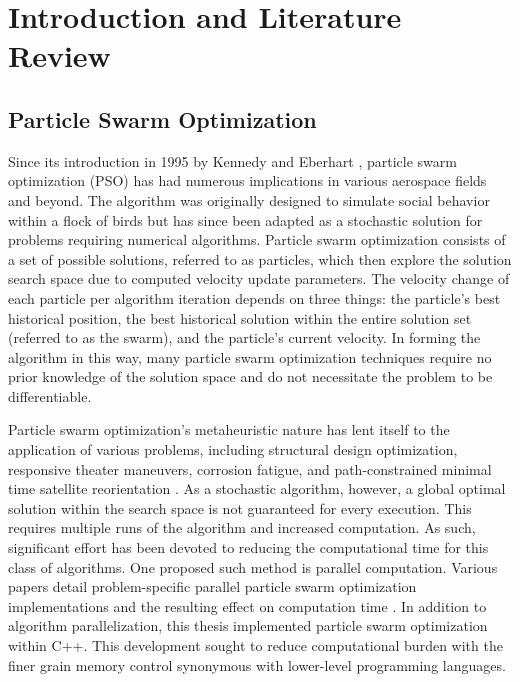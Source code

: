 \chapter{Introduction and Literature Review}
\newpage


\section{Particle Swarm Optimization}

\noindent Since its introduction in 1995 by Kennedy and Eberhart \citep{Initial_PSO}, particle swarm optimization (PSO) has had numerous implications in various aerospace fields and beyond.
The algorithm was originally designed to simulate social behavior within a flock of birds but has since been adapted as a stochastic solution for problems
requiring numerical algorithms. Particle swarm optimization consists of a set of possible solutions, referred to as particles, which then explore the solution search space due to
computed velocity update parameters. The velocity change of each particle per algorithm iteration depends on three things: the particle's best historical position, the best historical
solution within the entire solution set (referred to as the swarm), and the particle's current velocity. In forming the algorithm in this way, many particle swarm optimization techniques 
require no prior knowledge of the solution space and do not necessitate the problem to be differentiable. \newline

\noindent Particle swarm optimization's metaheuristic nature has lent itself to the application of various problems,
including structural design optimization, responsive theater maneuvers, corrosion fatigue, and path-constrained minimal time satellite reorientation
\citep{PSO1, PSO2, PSO3, PSO4}. As a stochastic algorithm, however, a global optimal solution within the search space is not guaranteed for every execution. 
This requires multiple runs of the algorithm and increased computation. As such, significant effort has been devoted to reducing the computational time for this class of
algorithms. One proposed such method is parallel computation. Various papers detail problem-specific parallel particle swarm optimization implementations and the resulting 
effect on computation time \citep{PPSO1, PPSO2, PPSO3}. In addition to algorithm parallelization, this thesis implemented particle swarm optimization within C++.
This development sought to reduce computational
burden with the finer grain memory control synonymous with lower-level programming languages. \newline

